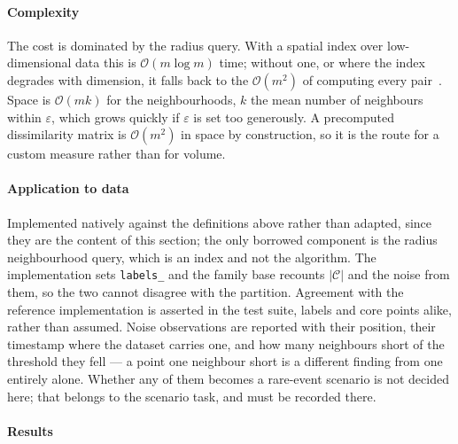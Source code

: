 \paragraph{Complexity}
\label{sec:tech:dbscan:complexity}
The cost is dominated by the radius query. With a spatial index over
low-dimensional data this is $\mathcal{O}(m \log m)$ time; without one, or
where the index degrades with dimension, it falls back to the
$\mathcal{O}(m^2)$ of computing every pair~\cite{ref_37}. Space is
$\mathcal{O}(mk)$ for the neighbourhoods, $k$ the mean number of
neighbours within $\varepsilon$, which grows quickly if $\varepsilon$ is
set too generously. A precomputed dissimilarity matrix is
$\mathcal{O}(m^2)$ in space by construction, so it is the route for a
custom measure rather than for volume.

\paragraph{Application to \projectname{} data}
\label{sec:tech:dbscan:application}
Implemented natively against the definitions above rather than adapted,
since they are the content of this section; the only borrowed component is
the radius neighbourhood query, which is an index and not the algorithm.
The implementation sets \texttt{labels\_} and the family base recounts
$|\mathcal C|$ and the noise from them, so the two cannot disagree with
the partition. Agreement with the reference implementation is asserted in
the test suite, labels and core points alike, rather than assumed.
Noise observations are reported with their position, their timestamp where
the dataset carries one, and how many neighbours short of the threshold
they fell --- a point one neighbour short is a different finding from one
entirely alone. Whether any of them becomes a rare-event scenario is not
decided here; that belongs to the scenario task, and must be recorded
there.

\paragraph{Results}
\label{sec:tech:dbscan:results}

